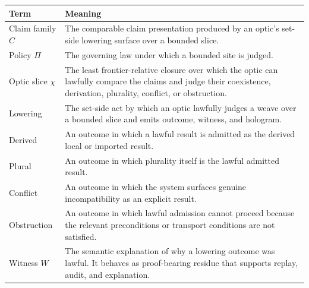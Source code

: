 \documentclass{aion}
\begin{document}
\begin{center}
	\AIONTableStyleOn
	\begin{tabularx}{\textwidth}{@{}>{\raggedright\arraybackslash}p{}X@{}}
		\toprule
		\AIONTableHead
		Term                       & Meaning                                                                                                                                                                                    \\
		\midrule
		Claim family \(C\)         & The comparable claim presentation produced by an optic's set-side lowering surface over a bounded slice.                                                                                   \\
		Policy \(\Pi\)             & The governing law under which a bounded site is judged.                                                                                                                                    \\
		Optic slice \(\chi\)       & The least frontier-relative closure over which the optic can lawfully compare the claims and judge their coexistence, derivation, plurality, conflict, or obstruction.                     \\
		Lowering                   & The set-side act by which an optic lawfully judges a weave over a bounded slice and emits outcome, witness, and hologram.                                                                  \\
		Derived                    & An outcome in which a lawful result is admitted as the derived local or imported result.                                                                                                   \\
Plural                     & An outcome in which plurality itself is the lawful admitted result.                                                                                                                         \\
Conflict                   & An outcome in which the system surfaces genuine incompatibility as an explicit result.                                                                                                     \\
Obstruction                & An outcome in which lawful admission cannot proceed because the relevant preconditions or transport conditions are not satisfied.                                                          \\
Witness \(W\)              & The semantic explanation of why a lowering outcome was lawful. It behaves as proof-bearing residue that supports replay, audit, and explanation.                                            \\

\end{tabularx}
\end{center}
\end{document}
